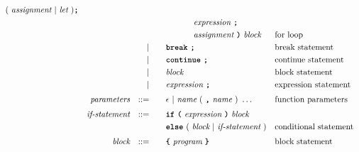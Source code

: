 \begin{alignat*}{9}
                                          (\ \textit{assignment} \ | \  \textit{let}\ ) \textbf{\texttt{;}} \\
&&                       &&     &\quad && \ \ \ \ \ \ \ \ \ \ \textit{expression} \ \textbf{\texttt{;}} \\
&&                       &&     &\quad && \ \ \ \ \ \ \ \ \ \ \textit{assignment} \ \textbf{\texttt{)}} \ 
                                            \textit{block}
                                                           && \textrm{for loop}\\
&&                       && |   &\quad && \textbf{\texttt{break}}\ \textbf{\texttt{;}}
                                                           && \textrm{break statement}\\
&&                       && |   &\quad && \textbf{\texttt{continue}}\ \textbf{\texttt{;}}
                                                           && \textrm{continue statement}\\
&&                       && |   &\quad &&  \textit{block} 
                                                           && \textrm{block statement}\\
&&                       && |   &\quad &&  \textit{expression} \ \textbf{\texttt{;}}
                                                           && \textrm{expression statement} \\[1mm]
&& \textit{parameters}   && ::= &\quad &&  \epsilon\ | \  \textit{name} \ 
                                                   (\ \textbf{\texttt{,}} \ \textit{name}\ )\ \ldots
                                                            && \textrm{function parameters}   \\[1mm]
&& \textit{if-statement} && ::= &\quad &&  \textbf{\texttt{if}}\
                                   \textbf{\texttt{(}}\ \textit{expression} \ \textbf{\texttt{)}}\ 
                                   \textit{block} \\
&&                       &&     &      && \textbf{\texttt{else}}\
                                          (\ \textit{block}
                                          \ | \
                                          \textit{if-statement} \ )
                                                            && \textrm{conditional statement}   \\[1mm]
&& \textit{block}        && ::= &      && \textbf{\texttt{\{}}\  \textit{program}   \ \textbf{\texttt{\}}} \quad
                                                           && \textrm{block statement}\\[1mm]         

\end{alignat*}
